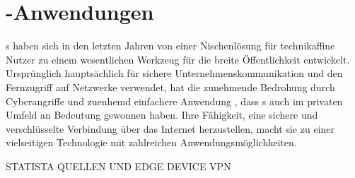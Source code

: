 \chapter{-Anwendungen}

s haben sich in den letzten Jahren von einer Nischenlösung für technikaffine Nutzer zu einem wesentlichen Werkzeug für die breite Öffentlichkeit entwickelt. Ursprünglich hauptsächlich für sichere Unternehmenskommunikation und den Fernzugriff auf Netzwerke verwendet, hat die zunehmende Bedrohung durch Cyberangriffe und zuenhemd einfachere Anwendung , dass s auch im privaten Umfeld an Bedeutung gewonnen haben. Ihre Fähigkeit, eine sichere und verschlüsselte Verbindung über das Internet herzustellen, macht sie zu einer vielseitigen Technologie mit zahlreichen Anwendungsmöglichkeiten.

STATISTA QUELLEN UND EDGE DEVICE VPN